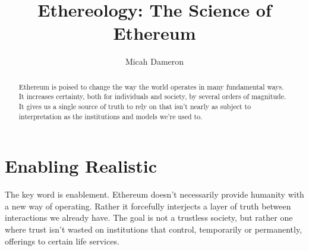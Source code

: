 \documentclass[a4paper,oneside]{memoir}
\title{Ethereology: The Science of Ethereum}
\author{Micah Dameron}
\begin{document}
\maketitle

\begin{abstract}
Ethereum is poised to change the way the world operates in many fundamental ways. It increases certainty, both for individuals and society, by several orders of magnitude. It gives us a single source of truth to rely on that isn't nearly as subject to interpretation as the institutions and models we're used to. 
\end{abstract}


\chapter{Enabling Realistic}
The key word is enablement. Ethereum  doesn't necessarily provide humanity with a new way of operating. Rather it forcefully interjects a layer of truth between interactions we already have. The goal is not a trustless society, but rather one where trust isn't wasted on institutions that control, temporarily or permanently, offerings to certain life services.
\end{document}
